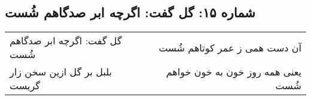 \begin{center}
\section*{شماره ۱۵: گل گفت: اگرچه ابر صدگاهم شُست}
\label{sec:015}
\begin{longtable}{l p{0.5cm} r}
گل گفت: اگرچه ابر صدگاهم شُست
&&
آن دست همی ز عمر کوتاهم شُست
\\
بلبل بر گل ازین سخن زار گریست
&&
یعنی همه روز خون به خون خواهم شُست
\\
\end{longtable}
\end{center}
